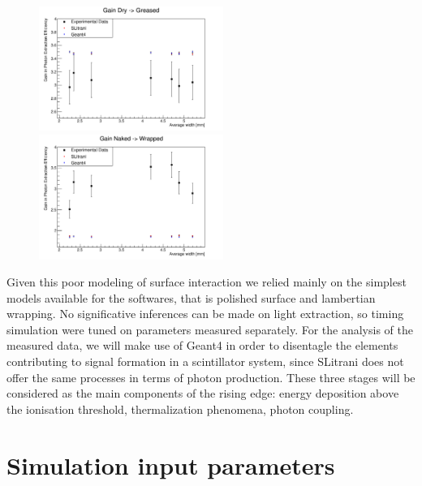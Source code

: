 \begin{figure}[htbp]
\begin{center}
\includegraphics[width=6cm]{../Pictures/Chapter_5/gain_grease.png}
\includegraphics[width=6cm]{../Pictures/Chapter_5/wrap_gain.png}
\end{center}
\caption[]{}
\label{fig:gain}
\end{figure}
Given this poor modeling of surface interaction we relied mainly on the simplest models available for the softwares, that is polished surface and lambertian wrapping. No significative inferences can be made on light extraction, so timing simulation were tuned on parameters measured separately.
For the analysis of the measured data, we will make use of Geant4 in order to disentagle the elements contributing to signal formation in a scintillator system, since SLitrani does not offer the same processes in terms of photon production.
These three stages will be considered as the main components of the rising edge: energy deposition above the ionisation threshold, thermalization phenomena, photon coupling.

\section{Simulation input parameters}

